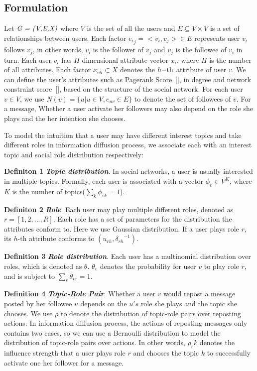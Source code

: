 \documentclass[runningheads,a4paper]{llncs}
\begin{document}
\subsection{Formulation}
Let $\mathbf{\emph{G = (V,E,X)}}$ where $V $ is the set of all the users and $E \subseteq V \times V $ is a set of relationships between users. Each factor ${e_i}_j =  < {v_i},{v_j} >  \in E$ represents user ${v_i} $ follows ${v_j} $, in other words, ${v_i}$ is the follower of ${v_j}$ and ${v_j}$ is the followee of ${v_i}$ in turn. Each user ${v_i} $ has $H$-dimensional attribute vector ${x_i} $, where $H$ is the number of all attributes. Each factor $ x_{vh} \subset X$ denotes the $h{\rm{ -th }}$ attribute of user $v$. We can define the user's attributes such as Pagerank Score~[\cite{page1999pagerank}], in degree and network  constraint score~[\cite{burt2009structural}], based on the structure of the social network. For each user $v \in V$, we use $N(v) = \{ u|u \in V,{e_{uv}} \in E\}$ to denote the set of followees of $v$. For a message, Whether a user activate her followers may also depend on the role she plays and the her intention she chooses.

To model the intuition that a user may have different interest topics and take different roles in information diffusion process, we associate each with an interest topic and social role distribution respectively:

\noindent\textbf{Definiton 1} \emph{\textbf{Topic distribution}}. In social networks, a user is usually interested in multiple topics. Formally, each user is associated with a vector ${\phi _v} \in {V^K}$, where $K$ is the number of topics($\sum\nolimits_k {{\phi _{vk}}}  = 1$).


\noindent\textbf{Definiton 2} \emph{\textbf{Role}}. Each user may play multiple different roles, denoted as $r = [1,2,...,R]$. Each role has a set of parameters for the distribution the attributes conform to. Here we use Gaussian distribution. If a user plays role $r$, its $h$-th attribute conforms to $({u_{rh}},{ \delta _{rh}}^{ - 1})$.

\noindent\textbf{Definition 3} \emph{\textbf{Role distribution}}. Each user has a multinomial distribution over roles, which is denoted as $\theta$.  \textbf{${\theta _v}$} denotes the probability for user $v$ to play role $r$, and is subject to ${\sum\nolimits_r \theta  _{vr}} = 1$.

\noindent\textbf{Definition 4} \emph{\textbf{Topic-Role Pair}}. Whether a user $v$ would repost a message posted by her followee $u$ depends on the $u's$ role she plays and the topic she chooses. We use $\rho $ to denote the distribution of topic-role pairs over reposting actions.
In information diffusion process, the actions of reposting messages only contains two cases, so we can use a Bernoulli distribution to model the distribution of topic-role pairs over actions. In other words, $\rho_rk $ denotes the influence strength that a user plays role $r$ and chooses the topic $k$ to successfully activate one her follower for a message.
\vspace{-15pt}
\end{document}
